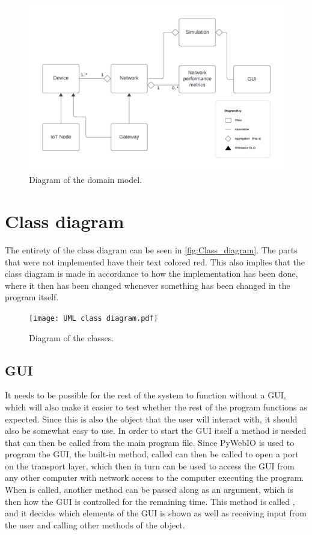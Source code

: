 \begin{figure}[H]
  \centering
  \includegraphics[width=\textwidth]{Domain_model.pdf}
  \caption{Diagram of the domain model.}
  \label{fig:Domain_model}
\end{figure}

\section{Class diagram}\label{sec:Class_diagram}
The entirety of the class diagram can be seen in \autoref{fig:Class_diagram}. The parts that were not implemented have their text colored red. This also implies that the class diagram is made in accordance to how the implementation has been done, where it then has been changed whenever something has been changed in the program itself.

\begin{figure}[H]
  \centering
  \texttt{[image: UML class diagram.pdf]}
  \caption{Diagram of the classes.}
  \label{fig:Class_diagram}
\end{figure}

\subsection{GUI} It needs to be possible for the rest of the system to function without a GUI, which will also make it easier to test whether the rest of the program functions as expected. Since this is also the object that the user will interact with, it should also be somewhat easy to use. In order to start the GUI itself a  method is needed that can then be called from the main program file. Since PyWebIO is used to program the GUI, the built-in method, called  can then be called to open a port on the transport layer, which then in turn can be used to access the GUI from any other computer with network access to the computer executing the program. When  is called, another method can be passed along as an argument, which is then how the GUI is controlled for the remaining time. This method is called , and it decides which elements of the GUI is shown as well as receiving input from the user and calling other methods of the  object.

